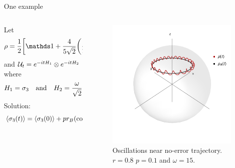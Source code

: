 \begin{frame}{One example}
    \begin{columns}
        \begin{column}{0.5\textwidth}
            Let
            \begin{equation*}
                \rho=\frac{1}{2}\qty[\Id+\frac{4}{5\sqrt{2}}\qty(\frac{1}{2}\pauli{1}+\frac{1}{2}\pauli{2}+\pauli{3})],
            \end{equation*}
            and $\mathcal{U}_{t}=e^{-itH_{1}}\otimes e^{-itH_{2}}$ where
                \begin{align*}
                    H_{1}=\sigma_{3} & & \text{and} & & H_{2}=\frac{\omega}{\sqrt{2}}(\sigma_{1}-\sigma_{2}).
                \end{align*}
            Solution:
            \begin{equation*}
                \expval{\sigma_{3}(t)}=\expval{\sigma_{3}(0)}+pr_{B}(\cos(2\omega t)-1).
            \end{equation*}
        \end{column}
        \begin{column}{0.5\textwidth}
            \begin{figure}[h!]
                \includegraphics[width=0.7\columnwidth]{figures/U1xU2_H1=(sz)_H2=15(sx-sy)_z=0.8_p=0.9_far.png}%
                \caption{Oscillations near no-error trajectory.\\ $r=0.8$ $p=0.1$ and $\omega=15$. }
            \end{figure}
        \end{column}
    \end{columns}
\end{frame}

